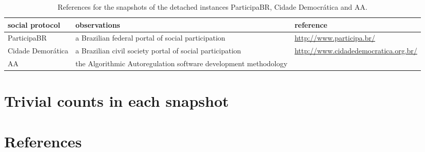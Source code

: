 \documentclass[review]{elsarticle}
\begin{document}
\begin{table*}[h!]\scriptsize
\begin{center}
\caption{References for the snapshots of the detached instances
ParticipaBR, Cidade Democrática and AA.}\label{tab:provenance}
\begin{tabular}{| l || p{4cm} | p{3cm} | }\hline
    \textbf{social protocol} & \textbf{observations} & \textbf{reference} \\\hline\hline
    ParticipaBR & a Brazilian federal portal of social participation & \url{http://www.participa.br/} \\\hline
    Cidade Demorática & a Brazilian civil society portal of social participation & \url{http://www.cidadedemocratica.org.br/} \\\hline
    AA & the Algorithmic Autoregulation software development methodology & \cite{aarticle} \\\hline
\end{tabular}\end{center}
\end{table*}                    


\clearpage
\section{Trivial counts in each snapshot}





\clearpage


\section*{References}

%

%
%
\end{document}
